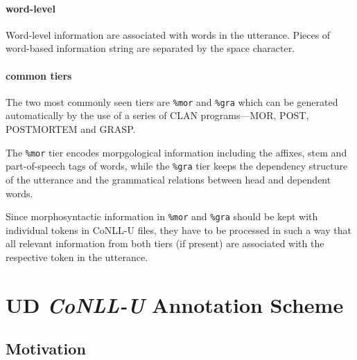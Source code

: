 \paragraph{word-level}
Word-level information are associated with words in the utterance. Pieces of word-based information string are separated by the space character.

\paragraph{common tiers}
The two most commonly seen tiers are \texttt{\%mor} and \texttt{\%gra} which can be generated automatically by the use of a series of CLAN programs---MOR, POST, POSTMORTEM and GRASP.

The \texttt{\%mor} tier encodes morpgological information including the affixes, stem and part-of-speech tags of words, while the \texttt{\%gra} tier keeps the dependency structure of the utterance and the grammatical relations between head and dependent words.

Since morphosyntactic information in \texttt{\%mor} and \texttt{\%gra} should be kept with individual tokens in CoNLL-U files, they have to be processed in such a way that all relevant information from both tiers (if present) are associated with the respective token in the utterance.



\section{UD \emph{CoNLL-U} Annotation Scheme}

\subsection{Motivation}

